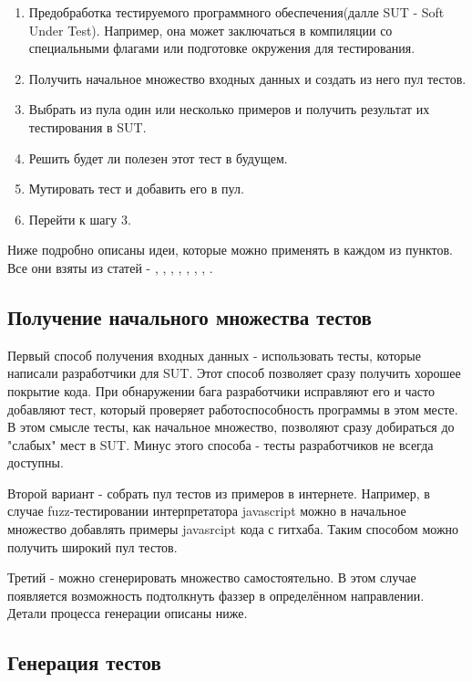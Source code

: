 \documentclass[a4paper]{article}
\begin{document}
\begin{enumerate}
    \item Предобработка тестируемого программного обеспечения(далле SUT - Soft Under Test). Например, она может заключаться в компиляции со специальными флагами или подготовке окружения для тестирования. 
    \item Получить начальное множество входных данных и создать из него пул тестов.
    \item Выбрать из пула один или несколько примеров и получить результат их тестирования в SUT.
    \item Решить будет ли полезен этот тест в будущем.
    \item Мутировать тест и добавить его в пул.
    \item Перейти к шагу 3.
\end{enumerate}

Ниже подробно описаны идеи, которые можно применять в каждом из пунктов. Все они взяты из статей - \cite{litlink1}, \cite{litlink2}, \cite{litlink3}, \cite{litlink4}, \cite{litlink5}, \cite{litlink6}, \cite{litlink7}, \cite{litlink8}.

\subsection{Получение начального множества тестов}
\indent

Первый способ получения входных данных\cite{litlink3} - использовать тесты, которые написали разработчики для SUT. Этот способ позволяет сразу получить хорошее покрытие кода. При обнаружении бага разработчики исправляют его и часто добавляют тест, который проверяет работоспособность программы в этом месте. В этом смысле тесты, как начальное множество, позволяют сразу добираться до "слабых" мест в SUT. Минус этого способа - тесты разработчиков не всегда доступны.
\indent

Второй вариант\cite{litlink3} - собрать пул тестов из примеров в интернете. Например, в случае fuzz-тестировании интерпретатора javascript можно в начальное множество добавлять примеры javasrcipt кода с гитхаба. Таким способом можно получить широкий пул тестов.
\indent

Третий\cite{litlink2} - можно сгенерировать множество самостоятельно. В этом случае появляется возможность подтолкнуть фаззер в определённом направлении. Детали процесса генерации описаны ниже.

\subsection{Генерация тестов}
\indent
\end{document}
